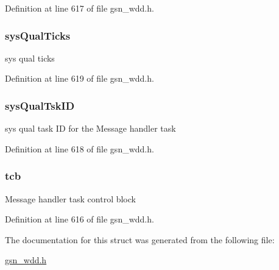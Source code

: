 Definition at line 617 of file gsn\_\-wdd.h.

\hypertarget{a00279_a3b8eb219c70a5f7fc6dcb9d9643cbc31}{
\subsubsection[{sysQualTicks}]{ {\bf sysQualTicks}}}
\label{a00279_a3b8eb219c70a5f7fc6dcb9d9643cbc31}
sys qual ticks 

Definition at line 619 of file gsn\_\-wdd.h.

\hypertarget{a00279_a3e06cb8fa58f49b7004a85c6f387ddc7}{
\subsubsection[{sysQualTskID}]{ {\bf sysQualTskID}}}
\label{a00279_a3e06cb8fa58f49b7004a85c6f387ddc7}
sys qual task ID for the Message handler task 

Definition at line 618 of file gsn\_\-wdd.h.

\hypertarget{a00279_afe071d7dcf0fdfb6314fefc4b6f663df}{
\subsubsection[{tcb}]{ {\bf tcb}}}
\label{a00279_afe071d7dcf0fdfb6314fefc4b6f663df}
Message handler task control block 

Definition at line 616 of file gsn\_\-wdd.h.



The documentation for this struct was generated from the following file:\begin{DoxyCompactItemize}
\item 
\hyperlink{a00603}{gsn\_\-wdd.h}\end{DoxyCompactItemize}
